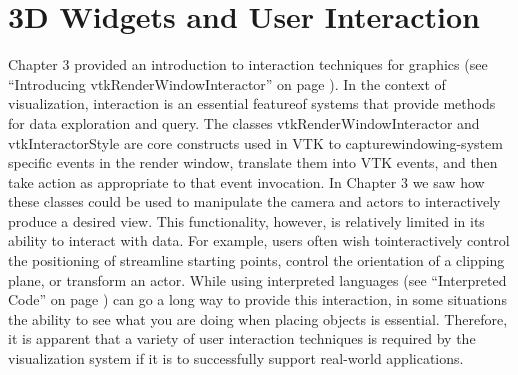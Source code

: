 \section{3D Widgets and User Interaction}
\label{sec:3dwui}
Chapter 3 provided an introduction to interaction techniques for graphics (see ``Introducing vtkRenderWindowInteractor'' on page \pageref{pg:rwi} ).
In the context of visualization, interaction is an essential featureof systems that provide methods for data exploration and query. The classes
vtkRenderWindowInteractor and vtkInteractorStyle are core constructs used in VTK to capturewindowing-system specific events in the render window, translate them into VTK events, and then take action as appropriate to that event invocation.
In Chapter 3 we saw how these classes could be used to manipulate the camera and actors to interactively produce a desired view. This functionality,
however, is relatively limited in its ability to interact with data. For example, users often wish tointeractively control the positioning of streamline starting points, control the orientation of a clipping plane, or transform an actor. While using interpreted languages (see ``Interpreted Code'' on page \pageref{pg:rwi} ) can go a long way to provide this interaction, in some situations the ability to see what you are doing when placing objects is essential. Therefore, it is apparent that a variety of user interaction techniques is required by the visualization system if it is to successfully support real-world applications.

